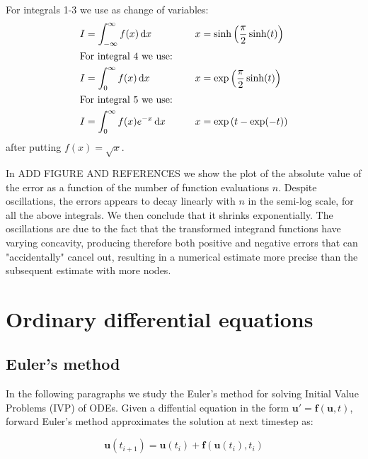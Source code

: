 \documentclass[a4paper,11]{article}
\begin{document}
For integrals 1-3 we use as change of variables:
\begin{alignat*}{2}
	&I=\int_{-\infty}^\infty f(x)\, \mathrm d x& \qquad &x=\sinh\left({\pi\over 2}\sinh(t)\right) \\
	\intertext{For integral 4 we use:}
	&I=\int_0^\infty f(x)\,\mathrm d x & \qquad &x=\exp\left({\pi\over 2}\sinh(t)\right) \\
	\intertext{For integral 5 we use:}
	&I=\int_0^\infty f(x)e^{-x}\,\mathrm d x & \qquad &x=\exp\left(t-\exp(-t)\right)
\end{alignat*}
after putting $f(x) = \sqrt x$.

In ADD FIGURE AND REFERENCES we show the plot of the absolute value of the 
error as a function of the number of function evaluations $n$. 
Despite oscillations, the errors appears to decay linearly with $n$ in the 
semi-log scale, for all the above integrals. We then conclude that it 
shrinks exponentially. The oscillations are due to the fact that the transformed
integrand functions have varying concavity, producing therefore
both positive and negative errors that can "accidentally" cancel out, 
resulting in a numerical estimate more precise
than the subsequent estimate with more nodes.


\section{Ordinary differential equations}

\subsection{Euler's method}

In the following paragraphs we study the Euler's method for solving 
Initial Value Problems (IVP) of ODEs. Given a diffential equation in the form
$\mathbf{u}' = \mathbf{f}(\mathbf{u},t)$, forward Euler's method 
approximates the solution at next timestep as:

\[
	\mathbf{u}(t_{i+1}) = \mathbf{u}(t_{i})+\mathbf{f}(\mathbf{u}(t_{i}),t_{i})
\]

\end{document}
